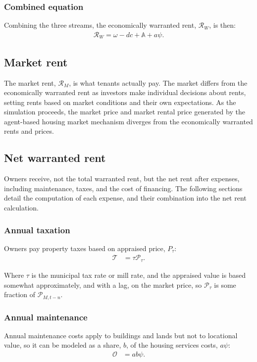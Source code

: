 \subsubsection{Combined equation}
Combining the three streams, the economically \gls{warranted rent}, $\mathcal{R}_W$, is then: 
\begin{align}
\mathcal{R}_W=\omega - {dc} + \mathbb{A} + a\psi.
\label{eqn-warranted-rent}
\end{align}

\subsection{Market rent} \label{section-market-rent}
The \gls{market rent}, $\mathcal{R}_M$, is what tenants actually pay. The market differs from the economically warranted rent as investors make individual decisions about rents, setting rents based on market conditions and their own expectations. 
As the simulation proceeds, the market price and market rental price generated by the agent-based housing market mechanism diverges from the economically warranted  rents and prices.

\subsection{Net warranted rent} \label{section-net-rent}
Owners receive, not the total warranted rent, but the \gls{net rent} after expenses, including maintenance, taxes, and the cost of financing. The following sections detail the computation of each expense, and their combination into the net rent calculation.

\subsubsection{Annual taxation}
Owners pay property taxes based on appraised price, $P_{\tau}$:
\begin{align*}
\mathcal{T} &= \tau  \mathcal{P}_{\tau}.
\end{align*}
 
Where $\tau$ is the municipal tax rate or \gls{mill rate}, and the \gls{appraised value} is based somewhat approximately, and with a lag, on the \gls{market price}, so $\mathcal{P}_{\tau}$ is some fraction of $\mathcal{P}_{M, t-n}$.

\subsubsection{Annual maintenance}
Annual maintenance costs apply to buildings and lands but not to locational value, so it can be modeled as a share, $b$, of the housing services costs, $a \psi$: 
\begin{align}
\mathcal{O} &= a b \psi.
\end{align}

